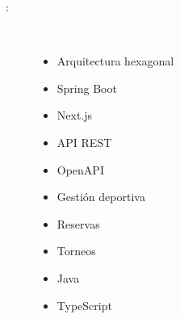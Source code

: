 \begin{description}
\item [\palabraschaveprincipal:] \mbox{} \\[-20pt]
  \begin{itemize}
    \item Arquitectura hexagonal
    \item Spring Boot
    \item Next.js
    \item API REST
    \item OpenAPI
    \item Gestión deportiva
    \item Reservas
    \item Torneos
    \item Java
    \item TypeScript
  \end{itemize}
\end{description}
